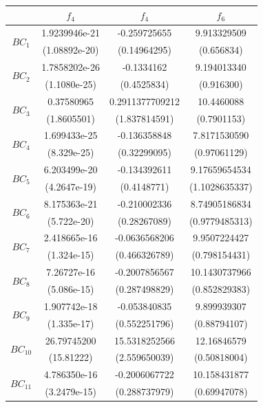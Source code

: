 \documentclass[conference]{IEEEtran}
\begin{document}
\begin{table}[htbp]
\begin{center}
\begin{tabular}{|c|c|c|c|}
\hline
& $ f_4 $ & $ f_4 $ & $ f_6 $\\\hline
\multirow{2}{*}{$ BC_1 $} &
1.9239946e-21 & -0.259725655 & 9.913329509\\
&(1.08892e-20) & (0.14964295) & (0.656834)\\
\hline
\multirow{2}{*}{$ BC_2 $} &
1.7858202e-26 & -0.1334162 & 9.194013340\\
&(1.1080e-25) & (0.4525834) & (0.916300)\\
\hline
\multirow{2}{*}{$ BC_3 $} &
0.37580965 & 0.2911377709212 & 10.4460088\\
&(1.8605501) & (1.837814591) & (0.7901153)\\
\hline
\multirow{2}{*}{$ BC_4 $} &
1.699433e-25 & -0.136358848 & 7.8171530590\\
&(8.329e-25) & (0.32299095) & (0.97061129)\\
\hline
\multirow{2}{*}{$ BC_5 $} &
6.203499e-20 & -0.134392611 & 9.17659654534\\
&(4.2647e-19) & (0.4148771) & (1.1028635337)\\
\hline
\multirow{2}{*}{$ BC_6 $} &
8.175363e-21 & -0.210002336 & 8.74905186834\\
&(5.722e-20) & (0.28267089) & (0.9779485313)\\
\hline
\multirow{2}{*}{$ BC_7 $} &
2.418665e-16 & -0.0636568206 & 9.9507224427\\
&(1.324e-15) & (0.466326789) & (0.798154431)\\
\hline
\multirow{2}{*}{$ BC_8 $} &
7.26727e-16 & -0.2007856567 & 10.1430737966\\
&(5.086e-15) & (0.287498829) & (0.852829383)\\
\hline
\multirow{2}{*}{$ BC_9 $} &
1.907742e-18 & -0.053840835 & 9.899939307\\
&(1.335e-17) & (0.552251796) & (0.88794107)\\
\hline
\multirow{2}{*}{$ BC_10 $} &
26.79745200 & 15.5318252566 & 12.16846579\\
&(15.81222) & (2.559650039) & (0.50818004)\\
\hline
\multirow{2}{*}{$ BC_11 $} &
4.786350e-16 & -0.2006067722 & 10.158431877\\
&(3.2479e-15) & (0.288737979) & (0.69947078)\\
\hline
\end{tabular}
\label{tab:glass}
\end{center}
\end{table}
\end{document}
